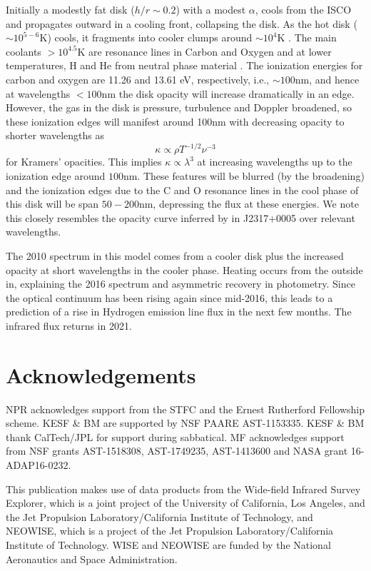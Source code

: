 \documentclass[11pt,a4paper]{article}
\begin{document}
Initially a modestly fat disk ($h/r \sim 0.2$) with a modest $\alpha$,
cools from the ISCO and propagates outward in a cooling front,
collapsing the disk. As the hot disk ($\sim 10^{5-6}$K) cools, it
fragments into cooler clumps around $\sim 10^{4}$K \citep[see e.g.,
][]{McCourt2016}.  The main coolants $>10^{4.5}$K are resonance lines
in Carbon and Oxygen and at lower temperatures, H and He from neutral
phase material \citep[see e.g., Fig. 18 in
][]{Sutherland_Dopita1993}. The ionization energies for carbon and
oxygen are 11.26 and 13.61 eV, respectively, i.e., $\sim 100$nm, and
hence at wavelengths $<100$nm the disk opacity will increase
dramatically in an edge.  However, the gas in the disk is pressure,
turbulence and Doppler broadened, so these ionization edges will
manifest around 100nm with decreasing opacity to shorter wavelengths
as
\begin{equation}
  \kappa \propto \rho T^{-1/2} \nu^{-3}
\end{equation}
for Kramers' opacities. This implies $\kappa \propto \lambda^{3}$
at increasing wavelengths up to the ionization edge around $100$nm.
These features will be blurred (by the broadening) and the ionization 
edges due to the C and O resonance lines in the cool phase of this
disk will be span $50-200$nm, depressing the flux at these energies. 
We note this closely resembles the opacity curve inferred by \citet{Guo2016} 
in J2317+0005 over relevant wavelengths.

The 2010 spectrum in this model comes from a cooler disk plus the
increased opacity at short wavelengths in the cooler phase. Heating
occurs from the outside in, explaining the 2016 spectrum and
asymmetric recovery in photometry.  Since the
optical continuum has been rising again since mid-2016, this leads to
a prediction of a rise in Hydrogen emission line flux in the next few
months. The infrared flux returns in 2021. 



\medskip
\medskip
\medskip
\section*{Acknowledgements}
NPR acknowledges support from the STFC and the Ernest Rutherford
Fellowship scheme.  KESF \& BM are supported by NSF PAARE
AST-1153335. KESF \& BM thank CalTech/JPL for support during
sabbatical.  MF acknowledges support from NSF grants AST-1518308,
AST-1749235, AST-1413600 and NASA grant 16-ADAP16-0232.

This publication makes use of data products from the Wide-field
Infrared Survey Explorer, which is a joint project of the University
of California, Los Angeles, and the Jet Propulsion
Laboratory/California Institute of Technology, and NEOWISE, which is a
project of the Jet Propulsion Laboratory/California Institute of
Technology. WISE and NEOWISE are funded by the National Aeronautics
and Space Administration.
\end{document}
